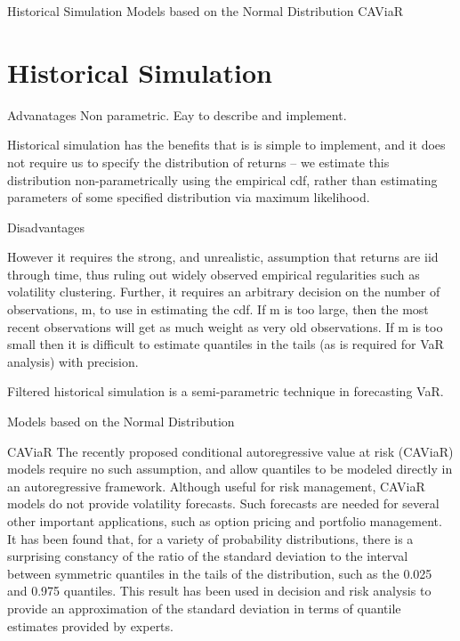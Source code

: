 

Historical Simulation
Models based on the Normal Distribution
CAViaR


\section*{Historical Simulation}

Advanatages
Non parametric. Eay to describe and implement.

Historical simulation has the beneﬁts that is is simple to implement, and it does not require us to specify the distribution of returns – we estimate this distribution non-parametrically using the empirical cdf, rather than estimating parameters of some speciﬁed distribution via maximum likelihood.


Disadvantages

However it requires the strong, and unrealistic, assumption that returns are iid through time, thus ruling out widely observed empirical regularities such as volatility clustering. Further, it requires an arbitrary decision on the number of observations, m, to use in estimating the cdf. If m is too large, then the most recent observations will get as much weight as very old
observations. If m is too small then it is diﬃcult to estimate quantiles in the tails (as is required for VaR analysis) with precision.


Filtered historical simulation is a semi-parametric technique in forecasting VaR.

Models based on the Normal Distribution


CAViaR
The recently proposed conditional autoregressive value at risk (CAViaR) models require no such assumption, and allow quantiles to be modeled directly in an autoregressive framework. Although useful for risk management, CAViaR models do not provide volatility forecasts. Such forecasts are needed for several other important applications, such as option pricing and portfolio management. It has been found that, for a variety of probability distributions, there is a surprising constancy of the ratio of the standard deviation to the interval between symmetric quantiles in the tails of the distribution, such as the 0.025 and 0.975 quantiles. This result has been used in decision and risk analysis to provide an approximation of the standard deviation in terms of quantile estimates provided by experts. 



